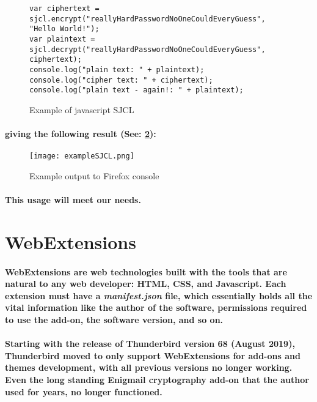 \begin{figure}[H]
\centering
\begin{verbatim}
var ciphertext = sjcl.encrypt("reallyHardPasswordNoOneCouldEveryGuess", "Hello World!");
var plaintext = sjcl.decrypt("reallyHardPasswordNoOneCouldEveryGuess", ciphertext);
console.log("plain text: " + plaintext);
console.log("cipher text: " + ciphertext);
console.log("plain text - again!: " + plaintext);
\end{verbatim}
\caption{\label{fig: exampleSJCL_js} Example of javascript SJCL}
\end{figure}

\paragraph{giving the following result (See: \ref{fig: exampleSJCL}):}

\begin{figure}[H]
\centering
\texttt{[image: exampleSJCL.png]}
\caption{\label{fig: exampleSJCL} Example output to Firefox console}
\end{figure}

\paragraph{This usage will meet our needs.}

\section{WebExtensions}

\paragraph{WebExtensions are web technologies built with the tools that are natural to any web developer: HTML, CSS, and Javascript. Each extension must have a \emph{manifest.json} file, which essentially holds all the vital information like the author of the software, permissions required to use the add-on, the software version, and so on.} \cite[Webpage]{WebEx}

\paragraph{Starting with the release of Thunderbird version 68 (August 2019), Thunderbird moved to only support WebExtensions for add-ons and themes development, with all previous versions no longer working. Even the long standing Enigmail cryptography add-on that the author used for years, no longer functioned.}

